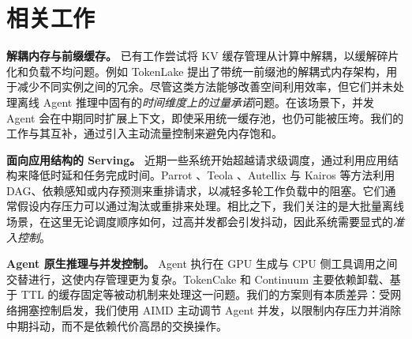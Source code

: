 \section{相关工作}
\textbf{解耦内存与前缀缓存。}
已有工作尝试将 KV 缓存管理从计算中解耦，以缓解碎片化和负载不均问题。例如 TokenLake \cite{tokenlake} 提出了带统一前缀池的解耦式内存架构，用于减少不同实例之间的冗余。尽管这类方法能够改善空间利用效率，但它们并未处理离线 Agent 推理中固有的\emph{时间维度上的过量承诺}问题。在该场景下，并发 Agent 会在中期同时扩展上下文，即使采用统一缓存池，也仍可能被压垮。我们的工作与其互补，通过引入主动流量控制来避免内存饱和。

\textbf{面向应用结构的 Serving。}
近期一些系统开始超越请求级调度，通过利用应用结构来降低时延和任务完成时间。Parrot \cite{parrot}、Teola \cite{teola}、Autellix \cite{autellix} 与 Kairos \cite{kairos} 等方法利用 DAG、依赖感知或内存预测来重排请求，以减轻多轮工作负载中的阻塞。它们通常假设内存压力可以通过淘汰或重排来处理。相比之下，我们关注的是大批量离线场景，在这里无论调度顺序如何，过高并发都会引发抖动，因此系统需要显式的\emph{准入控制}。

\textbf{Agent 原生推理与并发控制。}
Agent 执行在 GPU 生成与 CPU 侧工具调用之间交替进行，这使内存管理更为复杂。TokenCake \cite{tokencake} 和 Continuum \cite{continuum} 主要依赖卸载、基于 TTL 的缓存固定等被动机制来处理这一问题。我们的方案则有本质差异：受网络拥塞控制启发，我们使用 AIMD 主动调节 Agent 并发，以限制内存压力并消除中期抖动，而不是依赖代价高昂的交换操作。
